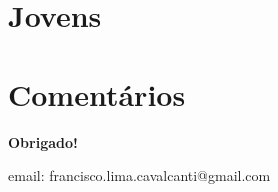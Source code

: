 \documentclass[8pt]{beamer}
\begin{document}
\begin{frame}[label=amzruralcnae2dig]{}
\textit{\hyperlink{indice_principal}{}}

\end{frame}

\section{Jovens}


\begin{frame}[label=amzjovemcod2dig]{}
\textit{\hyperlink{indice_principal}{}}

\end{frame}

\begin{frame}[label=amzjovemcnae2dig]{}
\textit{\hyperlink{indice_principal}{}}

\end{frame}


\section{Comentários}

\frame
{
\begin{center}
	\vfill
	\textbf{Obrigado!}
	\\

	\begin{small}
	email: francisco.lima.cavalcanti@gmail.com
	\end{small}
	\vfill     
\end{center}
}
\end{document}
